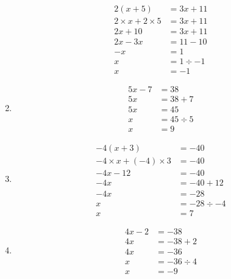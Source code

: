 \documentclass[11pt]{article}
\begin{document}
\begin{multicols}{3}
\begin{enumerate}
\begin{align*}
       2(x + 5) &= 3x + 11 \\
       2 \times x + 2 \times 5 &= 3x + 11 \\
       2x + 10 &= 3x + 11\\
       2x - 3x &= 11 - 10 \\
       -x &= 1 \\
       x &= 1 \div -1\\
       x &= -1      
    \end{align*}
    \item
    \begin{align*}
       5x - 7 &= 38 \\
       5x &= 38 + 7 \\
       5x &= 45 \\
       x &= 45 \div 5 \\
       x &= 9          
    \end{align*}
    \item
    \begin{align*}
       -4(x + 3) &= -40 \\
       -4 \times x + (-4) \times 3 &= -40 \\
       -4x - 12 &= -40\\
       -4x &= -40 + 12\\
       -4x &= -28 \\
       x &= -28 \div -4\\
       x &= 7         
    \end{align*}
    \item
    \begin{align*}
       4x - 2 &= -38  \\
       4x &= -38 + 2 \\
       4x &= -36  \\
       x &= -36 \div 4 \\
       x &= -9          
    \end{align*}
\end{enumerate}

\end{multicols}
\end{document}
